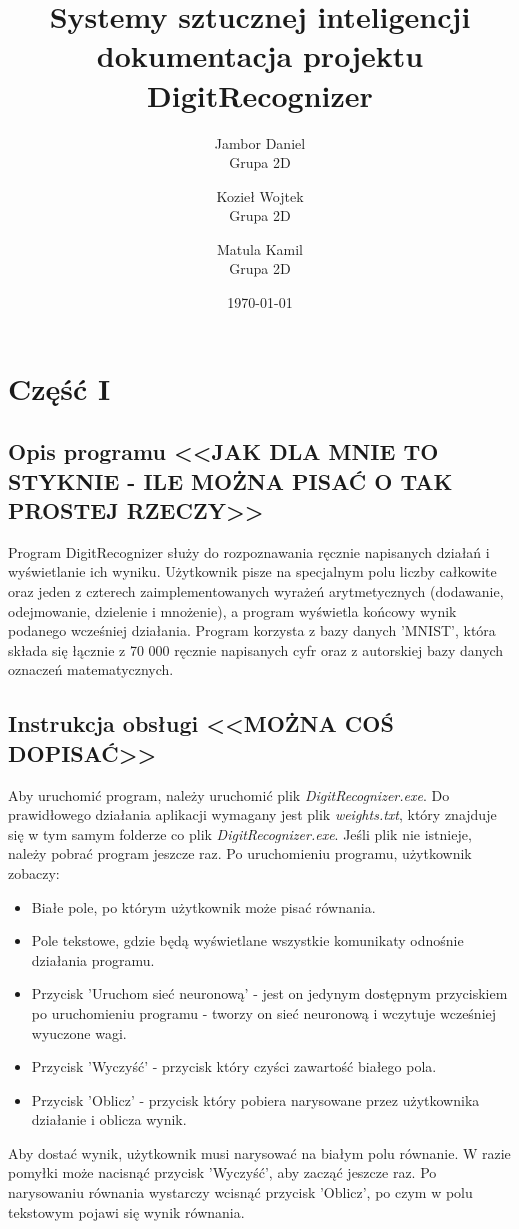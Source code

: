 \documentclass[12pt,a4paper]{article}
\begin{document}
	
	\title{Systemy sztucznej inteligencji\\\small{dokumentacja projektu DigitRecognizer}}
	\author{
	Jambor Daniel\\
	Grupa 2D
	\and
	Kozieł Wojtek\\
	Grupa 2D
	\and
	Matula Kamil\\
	Grupa 2D}

	\date{\today}

	\maketitle
	\newpage
	\section*{Część I}
	\subsection*{Opis programu <<JAK DLA MNIE TO STYKNIE - ILE MOŻNA PISAĆ O TAK PROSTEJ RZECZY>>}
	Program DigitRecognizer służy do rozpoznawania ręcznie napisanych  działań i wyświetlanie ich wyniku. Użytkownik pisze na specjalnym polu liczby całkowite oraz jeden z czterech zaimplementowanych wyrażeń arytmetycznych (dodawanie, odejmowanie, dzielenie i mnożenie), a program wyświetla końcowy wynik podanego wcześniej działania. Program korzysta z bazy danych 'MNIST', która składa się łącznie z 70 000 ręcznie napisanych cyfr oraz z autorskiej bazy danych oznaczeń matematycznych.
	
	
	
	
	
	\subsection*{Instrukcja obsługi <<MOŻNA COŚ DOPISAĆ>>}
	Aby uruchomić program, należy uruchomić plik \textit{DigitRecognizer.exe}. Do prawidłowego działania aplikacji wymagany jest plik \textit{weights.txt}, który znajduje się w tym samym folderze co plik \textit{DigitRecognizer.exe}. Jeśli plik nie istnieje, należy pobrać program jeszcze raz. Po uruchomieniu programu, użytkownik zobaczy:
	\begin{itemize}
	\item Białe pole, po którym użytkownik może pisać równania.
	\item Pole tekstowe, gdzie będą wyświetlane wszystkie komunikaty odnośnie działania programu.
	\item Przycisk 'Uruchom sieć neuronową' - jest on jedynym dostępnym przyciskiem po uruchomieniu programu - tworzy on sieć neuronową i wczytuje wcześniej wyuczone wagi.
	\item Przycisk 'Wyczyść' - przycisk który czyści zawartość białego pola.
	\item Przycisk 'Oblicz' - przycisk który pobiera narysowane przez użytkownika działanie i oblicza wynik.
	\end{itemize}
	Aby dostać wynik, użytkownik musi narysować na białym polu równanie. W razie pomyłki może nacisnąć przycisk 'Wyczyść', aby zacząć jeszcze raz. Po narysowaniu równania wystarczy wcisnąć przycisk 'Oblicz', po czym w polu tekstowym pojawi się wynik równania.
\end{document}
